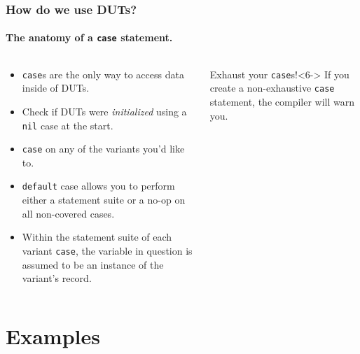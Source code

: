 \documentclass{beamer}
\begin{document}
\begin{frame}
 \frametitle{How do we use DUTs?}
 \framesubtitle{The anatomy of a \texttt{case} statement.}
    \begin{columns}[T,onlytextwidth]
        \begin{column}{.5\textwidth}
            \begin{minipage}{\textwidth}
                \begin{itemize}
                    \item<1-> \texttt{case}s are the only way to access data inside of DUTs.
                    \item<2-> Check if DUTs were \textit{initialized} using a \texttt{nil} case at the start.
                    \item<3-> \texttt{case} on any of the variants you'd like to.
                    \item<4-> \texttt{default} case allows you to perform either a statement suite or a no-op on all non-covered cases. 
                    \item<5-> Within the statement suite of each variant \texttt{case}, the variable in question is assumed to be an instance of the variant's record.
                \end{itemize}
            \end{minipage}
        \end{column}
        \begin{column}{.45\textwidth}
            \begin{onlyenv}
                \begin{minipage}{\textwidth}
                    \usebox{\anatomyOfCaseBox}
                    \begin{alertblock}{\footnotesize Exhaust your \texttt{case}s!}<6->
                        {\footnotesize If you create a non-exhaustive \texttt{case} statement, the compiler will warn you.}
                    \end{alertblock}
                \end{minipage}
            \end{onlyenv}
        \end{column}
    \end{columns}
\end{frame}

\section{Examples}
\end{document}
